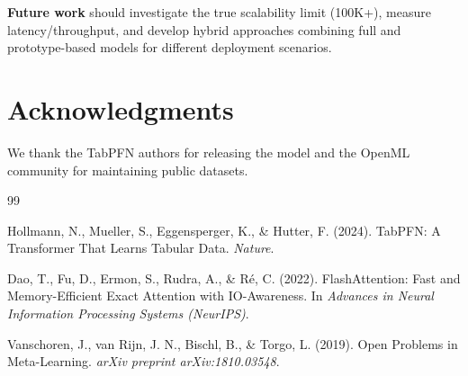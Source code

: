 \documentclass[11pt,a4paper]{article}
\begin{document}
\textbf{Future work} should investigate the true scalability limit (100K+), measure latency/throughput, and develop hybrid approaches combining full and prototype-based models for different deployment scenarios.

\section*{Acknowledgments}

We thank the TabPFN authors for releasing the model and the OpenML community for maintaining public datasets.

\begin{thebibliography}{99}

Hollmann, N., Mueller, S., Eggensperger, K., \& Hutter, F. (2024).
TabPFN: A Transformer That Learns Tabular Data.
\textit{Nature}.

Dao, T., Fu, D., Ermon, S., Rudra, A., \& Ré, C. (2022).
FlashAttention: Fast and Memory-Efficient Exact Attention with IO-Awareness.
In \textit{Advances in Neural Information Processing Systems (NeurIPS)}.

Vanschoren, J., van Rijn, J. N., Bischl, B., \& Torgo, L. (2019).
Open Problems in Meta-Learning.
\textit{arXiv preprint arXiv:1810.03548}.

\end{thebibliography}
\end{document}
